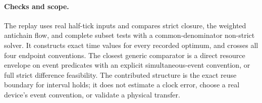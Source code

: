\documentclass[11pt]{article}
\begin{document}
\paragraph{Checks and scope.}
The replay uses real half-tick inputs and compares strict closure, the weighted antichain flow, and complete subset tests with a common-denominator non-strict solver. It constructs exact time values for every recorded optimum, and crosses all four endpoint conventions. The closest generic comparator is a direct resource envelope on event predicates with an explicit simultaneous-event convention, or full strict difference feasibility. The contributed structure is the exact reuse boundary for interval holds; it does not estimate a clock error, choose a real device's event convention, or validate a physical transfer.
\end{document}
